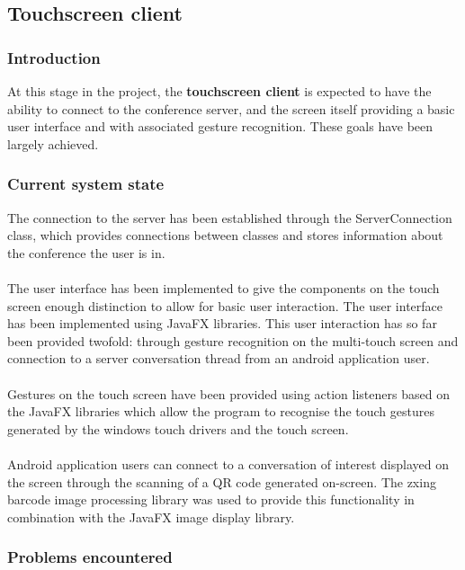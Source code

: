 \documentclass[12p, a4paper, onecolumn]{report}
\begin{document}
\subsection{Touchscreen client}

\subsubsection{Introduction}

At this stage in the project, the \textbf{touchscreen client} is expected to have the ability to connect to the conference server, and the screen itself providing a basic user interface and with associated gesture recognition. These goals have been largely achieved. 

\subsubsection{Current system state}

The connection to the server has been established through the ServerConnection class, which provides connections between classes and stores information about the conference the user is in. \\ \\
The user interface has been implemented to give the components on the touch screen enough distinction to allow for basic user interaction. The user interface has been implemented using JavaFX libraries. This user interaction has so far been provided twofold: through gesture recognition on the multi-touch screen and connection to a server conversation thread from an android application user. \\ \\
Gestures on the touch screen have been provided using action listeners based on the JavaFX libraries which allow the program to recognise the touch gestures generated by the windows touch drivers and the touch screen. \\ \\
Android application users can connect to a conversation of interest displayed on the screen through the scanning of a QR code generated on-screen. The zxing barcode image processing library was used to provide this functionality in combination with the JavaFX image display library.

\subsubsection{Problems encountered}
\end{document}
